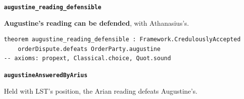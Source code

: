 \documentclass[11pt,paper=\testimonypaper,DIV=13,parskip=false]{scrartcl}
\begin{document}
\par\medskip\noindent\textbf{\texttt{augustine\_\allowbreak{}reading\_\allowbreak{}defensible}}\par\nobreak\noindent
\textbf{Augustine’s reading can be defended}, with Athanasius’s.

{\small\begin{verbatim}
theorem augustine_reading_defensible : Framework.CredulouslyAccepted
    orderDispute.defeats OrderParty.augustine
-- axioms: propext, Classical.choice, Quot.sound
\end{verbatim}}
\par\medskip\noindent\textbf{\texttt{augustine\allowbreak{}Answered\allowbreak{}By\allowbreak{}Arius}}\par\nobreak\noindent
Held with LST’s position, the Arian reading defeats Augustine’s.
\end{document}

